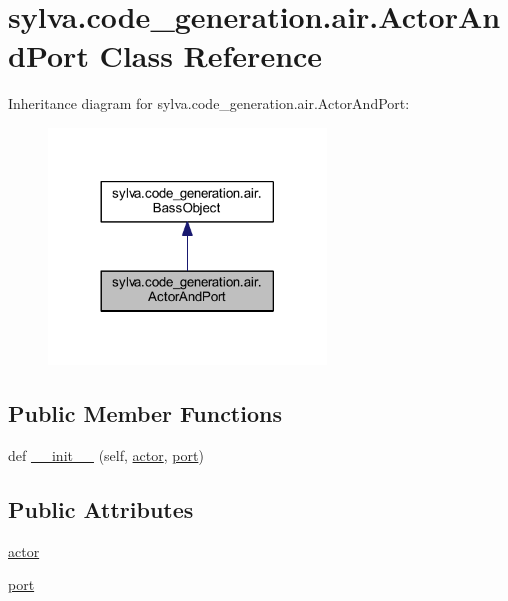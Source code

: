 \hypertarget{classsylva_1_1code__generation_1_1air_1_1_actor_and_port}{}\section{sylva.\+code\+\_\+generation.\+air.\+Actor\+And\+Port Class Reference}
\label{classsylva_1_1code__generation_1_1air_1_1_actor_and_port}


Inheritance diagram for sylva.\+code\+\_\+generation.\+air.\+Actor\+And\+Port\+:\nopagebreak
\begin{figure}[H]
\begin{center}
\leavevmode
\includegraphics[width=209pt]{classsylva_1_1code__generation_1_1air_1_1_actor_and_port__inherit__graph}
\end{center}
\end{figure}
\subsection*{Public Member Functions}
\begin{DoxyCompactItemize}
\item 
def \hyperlink{classsylva_1_1code__generation_1_1air_1_1_actor_and_port_ae88892bdf1efb9e78320ff9576f7c576}{\+\_\+\+\_\+init\+\_\+\+\_\+} (self, \hyperlink{classsylva_1_1code__generation_1_1air_1_1_actor_and_port_ae75bb4b57c6e2238f8f2fdadbc52311a}{actor}, \hyperlink{classsylva_1_1code__generation_1_1air_1_1_actor_and_port_a2401a1fc2b007251a2ed4918b484d687}{port})
\end{DoxyCompactItemize}
\subsection*{Public Attributes}
\begin{DoxyCompactItemize}
\item 
\hyperlink{classsylva_1_1code__generation_1_1air_1_1_actor_and_port_ae75bb4b57c6e2238f8f2fdadbc52311a}{actor}
\item 
\hyperlink{classsylva_1_1code__generation_1_1air_1_1_actor_and_port_a2401a1fc2b007251a2ed4918b484d687}{port}
\end{DoxyCompactItemize}


